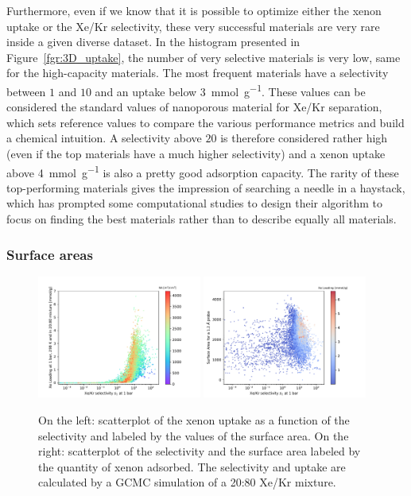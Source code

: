 \documentclass[main.tex]{subfiles}
\begin{document}
Furthermore, even if we know that it is possible to optimize either the xenon uptake or the Xe/Kr selectivity, these very successful materials are very rare inside a given diverse dataset. In the histogram presented in Figure~\ref{fgr:3D_uptake}, the number of very selective materials is very low, same for the high-capacity materials. The most frequent materials have a selectivity between $1$ and $10$ and an uptake below \SI{3}{\mmol\per\gram}. These values can be considered the standard values of nanoporous material for Xe/Kr separation, which sets reference values to compare the various performance metrics and build a chemical intuition. A selectivity above $20$ is therefore considered rather high (even if the top materials have a much higher selectivity\cite{Pei_2022}) and a xenon uptake above \SI{4}{\mmol\per\gram} is also a pretty good adsorption capacity. The rarity of these top-performing materials gives the impression of searching a needle in a haystack, which has prompted some computational studies to design their algorithm to focus on finding the best materials rather than to describe equally all materials.\cite{Deshwal_2021,Glasby_2021} 

\subsubsection{Surface areas}

\begin{figure}[h!]
  \centering
  \includegraphics[width=0.48\textwidth]{figures/2-thermo/Scatterplot_uptake_selectivity_sa.pdf}
  \includegraphics[width=0.48\textwidth]{figures/2-thermo/Scatterplot_sa_selectivity.pdf}
  \caption{On the left: scatterplot of the xenon uptake as a function of the selectivity and labeled by the values of the surface area. On the right: scatterplot of the selectivity and the surface area labeled by the quantity of xenon adsorbed. The selectivity and uptake are calculated by a GCMC simulation of a 20:80 Xe/Kr mixture.}\label{fgr:sa}
\end{figure}
\end{document}
